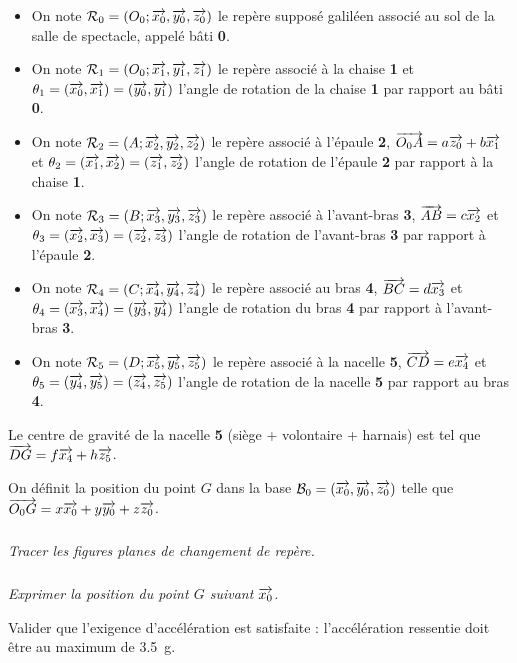\documentclass[10pt,fleqn]{article} %
\begin{document}
\begin{multicols}{2}
\begin{itemize}
\item On note $\mathcal{R}_{0}=\left(O_0;\overrightarrow{x_0},\overrightarrow{y_0},\overrightarrow{z_0} \right)$ le repère supposé galiléen associé au sol de la salle de spectacle, appelé bâti \textbf{0}.
\item On note $\mathcal{R}_{1}=\left(O_0;\overrightarrow{x_1},\overrightarrow{y_1},\overrightarrow{z_1} \right)$ le repère associé à la chaise \textbf{1} et $\theta_1=\left(\overrightarrow{x_0},\overrightarrow{x_1}\right)=\left(\overrightarrow{y_0},\overrightarrow{y_1}\right)$ l'angle de rotation de la chaise \textbf{1} par rapport au bâti \textbf{0}.
\item On note $\mathcal{R}_{2}=\left(A;\overrightarrow{x_2},\overrightarrow{y_2},\overrightarrow{z_2} \right)$ le repère associé à l'épaule \textbf{2}, $\overrightarrow{O_0A} = a\overrightarrow{z_0} + b\overrightarrow{x_1}$ et $\theta_2=\left(\overrightarrow{x_1},\overrightarrow{x_2}\right)=\left(\overrightarrow{z_1},\overrightarrow{z_2}\right)$ l'angle de rotation de l'épaule \textbf{2} par rapport à la chaise \textbf{1}.
\item On note $\mathcal{R}_{3}=\left(B;\overrightarrow{x_3},\overrightarrow{y_3},\overrightarrow{z_3} \right)$ le repère associé à l'avant-bras \textbf{3}, $\overrightarrow{AB} = c\overrightarrow{x_2}$ et $\theta_3=\left(\overrightarrow{x_2},\overrightarrow{x_3}\right)=\left(\overrightarrow{z_2},\overrightarrow{z_3}\right)$ l'angle de rotation de l'avant-bras \textbf{3} par rapport à l'épaule \textbf{2}.
\item On note $\mathcal{R}_{4}=\left(C;\overrightarrow{x_4},\overrightarrow{y_4},\overrightarrow{z_4} \right)$ le repère associé au bras \textbf{4}, $\overrightarrow{BC} = d\overrightarrow{x_3}$ et $\theta_4=\left(\overrightarrow{x_3},\overrightarrow{x_4}\right)=\left(\overrightarrow{y_3},\overrightarrow{y_4}\right)$ l'angle de rotation du bras \textbf{4} par rapport à l'avant-bras \textbf{3}.
\item On note $\mathcal{R}_{5}=\left(D;\overrightarrow{x_5},\overrightarrow{y_5},\overrightarrow{z_5} \right)$ le repère associé à la nacelle \textbf{5}, $\overrightarrow{CD} = e\overrightarrow{x_4}$ et $\theta_5=\left(\overrightarrow{y_4},\overrightarrow{y_5}\right)=\left(\overrightarrow{z_4},\overrightarrow{z_5}\right)$ l'angle de rotation de la nacelle \textbf{5} par rapport au bras \textbf{4}.
\end{itemize}
Le centre de gravité de la nacelle \textbf{5} (siège + volontaire + harnais) est tel que $\overrightarrow{DG}=f\overrightarrow{x_4}+h\overrightarrow{z_5}$. 

On définit la position du point $G$ dans la base $\mathcal{B}_0 = \left(\overrightarrow{x_0},\overrightarrow{y_0},\overrightarrow{z_0} \right)$ telle que $\overrightarrow{O_0 G} = x\overrightarrow{x_0}+y\overrightarrow{y_0}+z\overrightarrow{z_0}$.
 
\subparagraph{}
\textit{Tracer les figures planes de changement de repère.}
\ifprof
\begin{corrige}
\end{corrige}
\else\fi


\subparagraph{}
\textit{Exprimer la position du point $G$ suivant $\overrightarrow{x_0}$.}
\ifprof
\begin{corrige}
\end{corrige}
\else\fi

\begin{obj}
Valider que l'exigence d'accélération est satisfaite : l'accélération ressentie doit être au maximum de \SI{3,5}{g}.
\end{obj}



\end{multicols}
\end{document}
